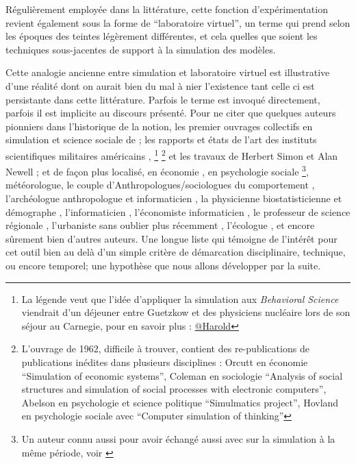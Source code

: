 Régulièrement employée dans la littérature, cette fonction d’expérimentation revient également sous la forme de \enquote{laboratoire virtuel}, un terme qui prend selon les époques des teintes légèrement différentes, et cela quelles que soient les techniques sous-jacentes de support à la simulation des modèles.

Cette analogie ancienne entre simulation et laboratoire virtuel est illustrative d'une réalité dont on aurait bien du mal à nier l'existence tant celle ci est persistante dans cette littérature. Parfois le terme est invoqué directement, parfois il est implicite au discours présenté. Pour ne citer que quelques auteurs pionniers dans l'historique de la notion, les premier ouvrages collectifs en simulation et science sociale de \textcite{Borko1962, Guetzkow1962, Guetzkow1972}; les rapports et états de l'art des instituts scientifiques militaires américains \autocite{Harman1961}, \footnote{La légende veut que l'idée d'appliquer la simulation aux \textit{Behavioral Science} viendrait d'un déjeuner entre Guetzkow et des physiciens nucléaire lors de son séjour au Carnegie, pour en savoir plus : \href{http://www.hawaii.edu/intlrel/pols635f/Guetzkow/hg.html}{@Harold} } \footnote{L'ouvrage de 1962, difficile à trouver, contient des re-publications de publications inédites dans plusieurs disciplines : Orcutt en économie \foreignquote{english}{Simulation of economic systems}, Coleman en sociologie \foreignquote{english}{Analysis of social structures and simulation of social processes with electronic computers}, Abelson en psychologie et science politique \foreignquote{english}{Simulmatics project}, Hovland en psychologie sociale avec \foreignquote{english}{Computer simulation of thinking} } et les travaux de Herbert Simon et Alan Newell \autocite{Newell1961}; et de façon plus localisé, en économie \textcite[915]{Shubik1960b}, en psychologie sociale \textcite{Abelson1968} \footnote{Un auteur connu aussi pour avoir échangé aussi avec \textcite{Boudon1967} sur la simulation à la même période, voir  \textcite{Padioleau1969}}, \textcite{Fleisher1965} météorologue, le couple d'Anthropologues/sociologues du comportement \textcite{Gullahorn1965}, l'archéologue anthropologue et informaticien \textcite{Doran1970}, la physicienne biostatisticienne et démographe \textcite{Sheps1971}, l'informaticien \textcite[3-4]{Forrester1971}, l'économiste informaticien \textcite{Naylor1966}, le professeur de science régionale \textcite[271]{Harris1966}, l'urbaniste \textcite[295]{Batty1976} sans oublier plus récemment \textcite{Epstein1996}, l'écologue \textcite{Grimm2006}, et encore sûrement bien d'autres auteurs. Une longue liste qui témoigne de l'intérêt pour cet outil bien au delà d'un simple critère de démarcation disciplinaire, technique, ou encore temporel; une hypothèse que nous allons développer par la suite.

